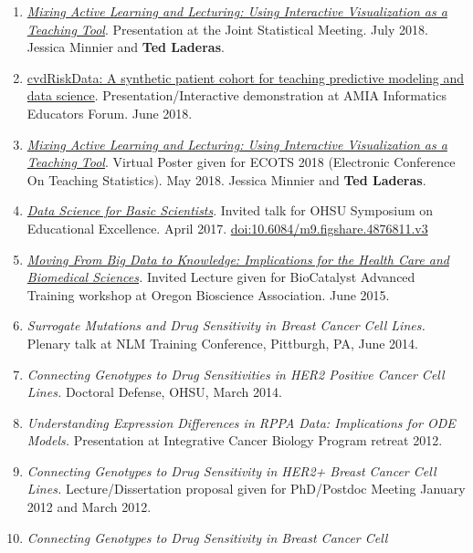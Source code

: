 \documentclass[11pt,]{article}
\begin{document}
\begin{enumerate}
\def\labelenumi{\arabic{enumi}.}
\item
  \href{https://ww2.amstat.org/meetings/jsm/2018/onlineprogram/AbstractDetails.cfm?abstractid=328720}{\emph{Mixing
  Active Learning and Lecturing: Using Interactive Visualization as a
  Teaching Tool}}. Presentation at the Joint Statistical Meeting. July
  2018. Jessica Minnier and \textbf{Ted Laderas}.
\item
  \href{http://laderast.github.io/talks/synth-data-laderas.pdf}{cvdRiskData:
  A synthetic patient cohort for teaching predictive modeling and data
  science}. Presentation/Interactive demonstration at AMIA Informatics
  Educators Forum. June 2018.
\item
  \href{https://www.causeweb.org/cause/ecots/ecots18/posters/3-03}{\emph{Mixing
  Active Learning and Lecturing: Using Interactive Visualization as a
  Teaching Tool}}. Virtual Poster given for ECOTS 2018 (Electronic
  Conference On Teaching Statistics). May 2018. Jessica Minnier and
  \textbf{Ted Laderas}.
\item
  \href{http://laderast.github.io/DS4BS/}{\emph{Data Science for Basic
  Scientists}}. Invited talk for OHSU Symposium on Educational
  Excellence. April 2017.
  \href{https://doi.org/10.6084/m9.figshare.4876811.v3}{doi:10.6084/m9.figshare.4876811.v3}
\item
  \href{https://www.dropbox.com/s/ls6agg9uy2b6wp4/big-data-talk_laderas.pdf?dl=0}{\emph{Moving
  From Big Data to Knowledge: Implications for the Health Care and
  Biomedical Sciences}}\emph{.} Invited Lecture given for BioCatalyst
  Advanced Training workshop at Oregon Bioscience Association. June
  2015.
\item
  \emph{Surrogate Mutations and Drug Sensitivity in Breast Cancer Cell
  Lines.} Plenary talk at NLM Training Conference, Pittburgh, PA, June
  2014.
\item
  \emph{Connecting Genotypes to Drug Sensitivities in HER2 Positive
  Cancer Cell Lines.} Doctoral Defense, OHSU, March 2014.
\item
  \emph{Understanding Expression Differences in RPPA Data: Implications
  for ODE Models.} Presentation at Integrative Cancer Biology Program
  retreat 2012.
\item
  \emph{Connecting Genotypes to Drug Sensitivity in HER2+ Breast Cancer
  Cell Lines.} Lecture/Dissertation proposal given for PhD/Postdoc
  Meeting January 2012 and March 2012.
\item
  \emph{Connecting Genotypes to Drug Sensitivity in Breast Cancer Cell
}
\end{enumerate}
\end{document}
